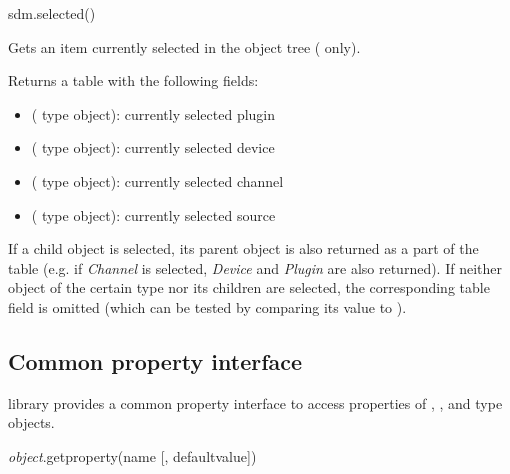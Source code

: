 \documentclass[a4paper,12pt,twoside,extrafontsizes]{memoir}
\begin{document}

\begin{luafuncprototype}
sdm.selected()
\end{luafuncprototype}

\begin{funcdescr}
	Gets an item currently selected in the object tree ( only).
\end{funcdescr}

\begin{funcret}
	Returns a table with the following fields:
	\begin{itemize}
		\item {} ( type object): currently selected plugin
		\item {} ( type object): currently selected device
		\item {} ( type object): currently selected channel
		\item {} ( type object): currently selected source
	\end{itemize}
	
	If a child object is selected, its parent object is also returned as a part of the table (e.g. if \emph{Channel} is selected, \emph{Device} and \emph{Plugin} are also returned). If neither object of the certain type nor its children are selected, the corresponding table field is omitted (which can be tested by comparing its value to ).
\end{funcret}

\subsection{Common property interface}
\label{subsec:luaproperties}

\begin{funcdescr}
	 library provides a common property interface to access properties of , ,  and  type objects.
\end{funcdescr}


\begin{luafuncprototype}
\emph{object}.getproperty(name [, defaultvalue])
\end{luafuncprototype}
\end{document}
